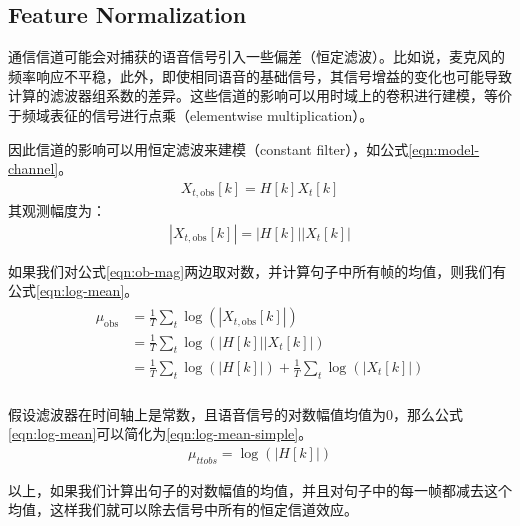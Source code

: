 \subsection{Feature Normalization} %
\label{sub:feature_normalization}
通信信道可能会对捕获的语音信号引入一些偏差（恒定滤波）。比如说，麦克风的频率响应不平稳，此外，即使相同语音的基础信号，其信号增益的变化也可能导致计算的滤波器组系数的差异。这些信道的影响可以用时域上的卷积进行建模，等价于频域表征的信号进行点乘（elementwise multiplication）。

因此信道的影响可以用恒定滤波来建模（constant filter），如公式\ref{eqn:model-channel}。
\begin{align}
\label{eqn:model-channel}
X_{t, \mathrm{obs}}[k]=H[k] X_{t}[k]
\end{align}
其观测幅度为：
\begin{align}
\label{eqn:ob-mag}
\left|X_{t, \mathrm{obs}}[k]\right|=|H[k]|\left|X_{t}[k]\right|
\end{align}

如果我们对公式\ref{eqn:ob-mag}两边取对数，并计算句子中所有帧的均值，则我们有公式\ref{eqn:log-mean}。
\begin{align}
\begin{split}
\label{eqn:log-mean}
\mu_{\mathrm{obs}}
		&=\frac{1}{T} \sum_{t} \log \left(\left|X_{t, \mathrm{obs}}[k]\right|\right) \\
		&=\frac{1}{T} \sum_{t} \log \left(|H[k]|\left|X_{t}[k]\right|\right) \\
		&=\frac{1}{T} \sum_{t} \log (|H[k]|)+\frac{1}{T} \sum_{t} \log \left(\left|X_{t}[k]\right|\right)\\
\end{split}
\end{align}

假设滤波器在时间轴上是常数，且语音信号的对数幅值均值为0，那么公式\ref{eqn:log-mean}可以简化为\ref{eqn:log-mean-simple}。
\begin{align}
\label{eqn:log-mean-simple}
	\mu_{t t o b s}=\log (|H[k]|)
\end{align}

以上，如果我们计算出句子的对数幅值的均值，并且对句子中的每一帧都减去这个均值，这样我们就可以除去信号中所有的恒定信道效应。


